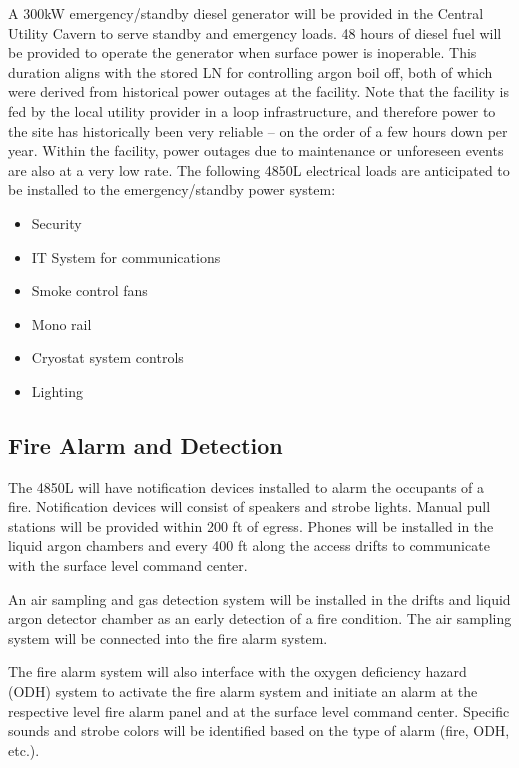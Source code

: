 A 300kW emergency/standby diesel generator will be provided in the Central Utility Cavern to serve standby and emergency loads. 48 hours of diesel fuel will be provided to operate the generator when surface power is inoperable. This duration aligns with the stored LN for controlling argon boil off, both of which were derived from historical power outages at the facility.  Note that the facility is fed by the local utility provider in a loop infrastructure, and therefore power to the site has historically been very reliable -- on the order of a few hours down per year.  Within the facility, power outages due to maintenance or unforeseen events are also at a very low rate.  The following 4850L electrical loads are anticipated to be installed to the emergency/standby power system:

\begin{itemize}
\item Security
\item IT System for communications
\item Smoke control fans
\item Mono rail
\item Cryostat system controls
\item Lighting
\end{itemize}

\subsection{Fire Alarm and Detection}
\label{sec:fscf-und-fire-alarm}

The 4850L will have notification devices installed to alarm the occupants of a fire. Notification devices will consist of speakers and strobe lights. Manual pull stations will be provided within 200 ft of egress. Phones will be installed in the liquid argon chambers and every 400 ft along the access drifts to communicate with the surface level command center.

An air sampling and gas detection system will be installed in the drifts and liquid argon detector chamber as an early detection of a fire condition. The air sampling system will be connected into the fire alarm system.

The fire alarm system will also interface with the oxygen deficiency hazard (ODH) system to activate the fire alarm system and initiate an alarm at the respective level fire alarm panel and at the surface level command center. Specific sounds and strobe colors will be identified based on the type of alarm (fire, ODH, etc.).


